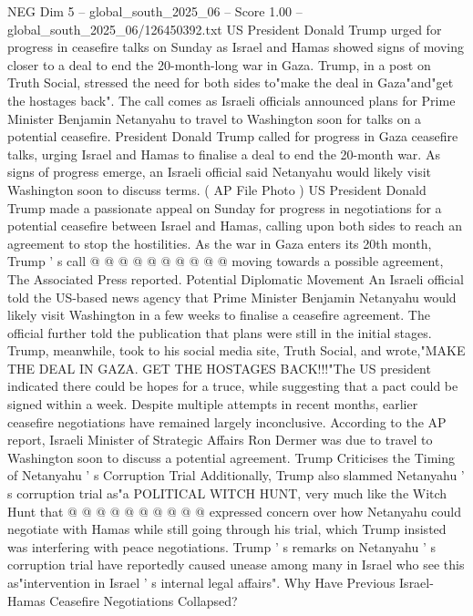\begin{textsample}{NEG Dim 5 – global\_south\_2025\_06 – Score 1.00 – global\_south\_2025\_06/126450392.txt}  \label{ex:f5_neg_415}
US President Donald Trump urged for progress in ceasefire talks on Sunday as Israel and Hamas showed signs of moving closer to a deal to end the 20-month-long war in Gaza.
Trump, in a post on Truth Social, stressed the need for both sides to"make the deal in Gaza"and"get the hostages back".
The call comes as Israeli officials announced plans for Prime Minister Benjamin Netanyahu to travel to Washington soon for talks on a potential ceasefire.
President Donald Trump called for progress in Gaza ceasefire talks, urging Israel and Hamas to finalise a deal to end the 20-month war.
As signs of progress emerge, an Israeli official said Netanyahu would likely visit Washington soon to discuss terms. ( AP File Photo ) US President Donald Trump made a passionate appeal on Sunday for progress in negotiations for a potential ceasefire between Israel and Hamas, calling upon both sides to reach an agreement to stop the hostilities.
As the war in Gaza enters its 20th month, Trump ' s call @ @ @ @ @ @ @ @ @ @ moving towards a possible agreement, The Associated Press reported.
Potential Diplomatic Movement An Israeli official told the US-based news agency that Prime Minister Benjamin Netanyahu would likely visit Washington in a few weeks to finalise a ceasefire agreement.
The official further told the publication that plans were still in the initial stages.
Trump, meanwhile, took to his social media site, Truth Social, and wrote,"MAKE THE DEAL IN GAZA.
GET THE HOSTAGES BACK!!!"The US president indicated there could be hopes for a truce, while suggesting that a pact could be signed within a week.
Despite multiple attempts in recent months, earlier ceasefire negotiations have remained largely inconclusive.
According to the AP report, Israeli Minister of Strategic Affairs Ron Dermer was due to travel to Washington soon to discuss a potential agreement.
Trump Criticises the Timing of Netanyahu ' s Corruption Trial Additionally, Trump also slammed Netanyahu ' s corruption trial as"a POLITICAL WITCH HUNT, very much like the Witch Hunt that @ @ @ @ @ @ @ @ @ @ expressed concern over how Netanyahu could negotiate with Hamas while still going through his trial, which Trump insisted was interfering with peace negotiations.
Trump ' s remarks on Netanyahu ' s corruption trial have reportedly caused unease among many in Israel who see this as"intervention in Israel ' s internal legal affairs".
Why Have Previous Israel-Hamas Ceasefire Negotiations Collapsed?

\end{textsample}
